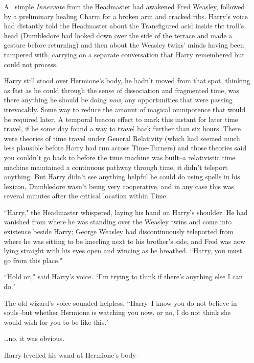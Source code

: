 
\lettrine{A}{~} simple \emph{Innervate} from the Headmaster had awakened Fred Weasley, followed by a preliminary healing Charm for a broken arm and cracked ribs. Harry's voice had distantly told the Headmaster about the Transfigured acid inside the troll's head (Dumbledore had looked down over the side of the terrace and made a gesture before returning) and then about the Weasley twins' minds having been tampered with, carrying on a separate conversation that Harry remembered but could not process.

Harry still stood over Hermione's body, he hadn't moved from that spot, thinking as fast as he could through the sense of dissociation and fragmented time, was there anything he should be doing \emph{now}, any opportunities that were passing irrevocably. Some way to reduce the amount of magical omnipotence that would be required later. A temporal beacon effect to mark this instant for later time travel, if he some day found a way to travel back further than six hours. There were theories of time travel under General Relativity (which had seemed much less plausible before Harry had run across Time-Turners) and those theories said you couldn't go back to before the time machine was built\---a relativistic time machine maintained a continuous pathway through time, it didn't teleport anything. But Harry didn't see anything helpful he could do using spells in his lexicon, Dumbledore wasn't being very cooperative, and in any case this was several minutes after the critical location within Time.

``Harry," the Headmaster whispered, laying his hand on Harry's shoulder. He had vanished from where he was standing over the Weasley twins and come into existence beside Harry; George Weasley had discontinuously teleported from where he was sitting to be kneeling next to his brother's side, and Fred was now lying straight with his eyes open and wincing as he breathed. ``Harry, you must go from this place."

``Hold on," said Harry's voice. ``I'm trying to think if there's anything else I can do."

The old wizard's voice sounded helpless. ``Harry\---I know you do not believe in souls\---but whether Hermione is watching you now, or no, I do not think she would wish for you to be like this."

{\ldots}no, it was obvious.

Harry levelled his wand at Hermione's body\---

